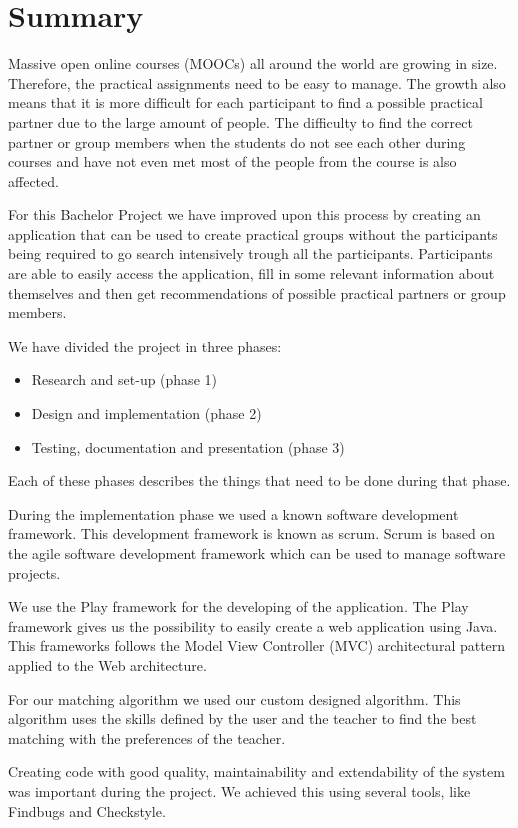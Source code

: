 \chapter*{Summary}

Massive open online courses (MOOCs) all around the world are growing in size. 
Therefore, the practical assignments need to be easy to manage.
The growth also means that it is more difficult for each participant to find a possible practical partner due to the large amount of people.
The difficulty to find the correct partner or group members when the students do not see each other during courses and have not even met most of the people from the course is also affected.

For this Bachelor Project we have improved upon this process by creating an application that can be used to create practical groups without the participants being required to go search intensively trough all the participants.
Participants are able to easily access the application, fill in some relevant information about themselves and then get recommendations of possible practical partners or group members.

We have divided the project in three phases:
\begin{itemize}
\item Research and set-up (phase 1)
\item Design and implementation (phase 2)
\item Testing, documentation and presentation (phase 3)
\end{itemize}
Each of these phases describes the things that need to be done during that phase.

During the implementation phase we used a known software development framework.
This development framework is known as scrum.
Scrum is based on the agile software development framework which can be used to 
manage software projects.

We use the Play framework for the developing of the application. 
The Play framework gives us the possibility to easily create a web application using Java.
This frameworks follows the Model View Controller (MVC) architectural pattern applied to the Web architecture.

For our matching algorithm we used our custom designed algorithm.
This algorithm uses the skills defined by the user and the teacher to find the best matching with the preferences of the teacher.


Creating code with good quality, maintainability and extendability of the system was important during the project.
We achieved this using several tools, like Findbugs and Checkstyle.

